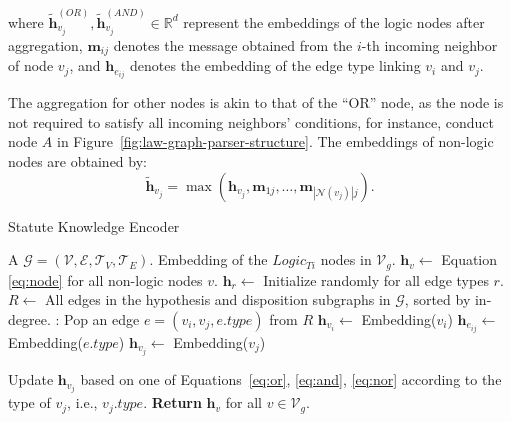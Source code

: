 
\noindent where $\tilde{\mathbf{h}}_{v_j}^{(OR)}, \tilde{\mathbf{h}}_{v_j}^{(AND)} \in \mathbb{R}^{d}$ represent the embeddings of the logic nodes after aggregation, $\mathbf{m}_{ij}$ denotes the message obtained from the $i$-th incoming neighbor of node $v_j$, and $\mathbf{h}_{e_{ij}}$ denotes the embedding of the edge type linking $v_i$ and $v_j$. 

The aggregation for other nodes is akin to that of the ``OR'' node, as the node is not required to satisfy all incoming neighbors' conditions, for instance, conduct node $A$ in Figure~\ref{fig:law-graph-parser-structure}. The embeddings of non-logic nodes are obtained by:
\begin{equation}
\tilde{\mathbf{h}}_{v_j} = \max({\mathbf{h}_{v_j},\mathbf{m}_{1j},\ldots,\mathbf{m}_{|\mathcal{N}(v_j)|j}}).
\label{eq:nor}
\end{equation}

\begin{algorithm}[t]
\small
\caption{Statute Knowledge Encoder}
\label{alg:encoding}
\begin{algorithmic}[1]
\Require A \lawgraph{} $\mathcal{G}=(\mathcal{V}, \mathcal{E}, \mathcal{T}_V, \mathcal{T}_E)$. 
\Ensure Embedding of the $Logic_{Ti}$ nodes in $\mathcal{V}_g$. 
\State $\mathbf{h}_v \gets $ Equation \ref{eq:node} for all non-logic nodes $v$.
\State $\mathbf{h}_r \gets $ Initialize randomly for all edge types $r$.
\State $R \gets$ All edges in the hypothesis and disposition subgraphs in $\mathcal{G}$, sorted by in-degree. 
:
    \State Pop an edge \( e=(v_i, v_j, e.type) \) from \( R \)
    \State \( \mathbf{h}_{v_i} \gets \) Embedding(\( v_i \)) %
    \State \( \mathbf{h}_{e_{ij}} \gets \) Embedding(\(e.type \)) %
    \State \( \mathbf{h}_{v_j} \gets \) Embedding(\( v_j \)) %
    
    \State Update \( \mathbf{h}_{v_j} \) based on one of Equations~\ref{eq:or}, \ref{eq:and}, \ref{eq:nor} according to the type of $v_j$, i.e., $v_j.type$.
\EndWhile
\State \textbf{Return} $\mathbf{h}_{v}$ for all $v\in \mathcal{V}_g$.
\end{algorithmic}
\end{algorithm}


